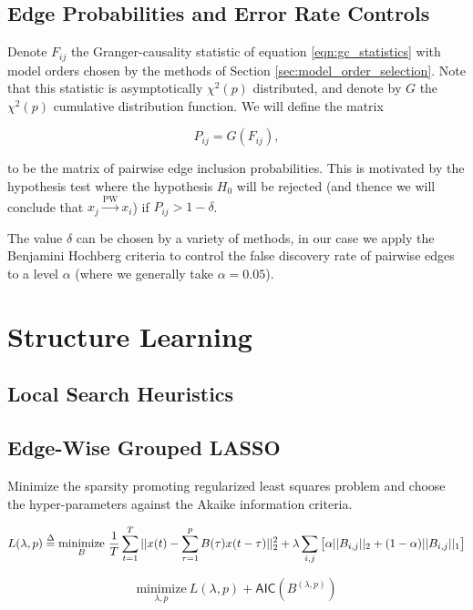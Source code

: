 \documentclass[12pt]{article}
\def\pwgc{\overset{\text{PW}}{\rightarrow}}  %
\begin{document}
\subsection{Edge Probabilities and Error Rate Controls}
Denote $F_{ij}$ the Granger-causality statistic of equation
\ref{eqn:gc_statistics} with model orders chosen by the methods of
Section \ref{sec:model_order_selection}.  Note that this statistic is
asymptotically $\chi^2(p)$ distributed, and denote by $G$ the
$\chi^2(p)$ cumulative distribution function.  We will define the matrix

\begin{equation}
  \label{eqn:edge_inclusion_probability}
  P_{ij} = G(F_{ij}),
\end{equation}

to be the matrix of pairwise edge inclusion probabilities.  This is
motivated by the hypothesis test where the hypothesis $H_0$ will be
rejected (and thence we will conclude that $x_j \pwgc x_i$) if
$P_{ij} > 1 - \delta$.

The value $\delta$ can be chosen by a variety of methods, in our case
we apply the Benjamini Hochberg criteria \cite{benjamini_hochberg}
\cite{all_of_statistics} to control the false discovery rate of
pairwise edges to a level $\alpha$ (where we generally take
$\alpha = 0.05$).

\section{Structure Learning}
\label{sec:structure_learning}
\subsection{Local Search Heuristics}


\subsection{Edge-Wise Grouped LASSO}
Minimize the sparsity promoting regularized least squares problem and choose the hyper-parameters against the Akaike information criteria.

\begin{equation}
  L(\lambda, p) \overset{\Delta}{=} \underset{B}{\text{minimize}}\ \frac{1}{T}\sum_{t = 1}^T||x(t) - \sum_{\tau = 1}^pB(\tau)x(t - \tau)||_2^2 + \lambda \sum_{i, j}\big[\alpha||B_{i, j}||_2 + (1 - \alpha)||B_{i, j}||_1\big]
\end{equation}

\begin{equation}
  \underset{\lambda, p}{\text{minimize}}\ L(\lambda, p) + \mathsf{AIC}(B^{(\lambda, p)})
\end{equation}
\end{document}
